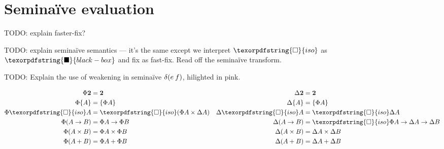 \documentclass{rntz}\usepackage[a5]{rntzgeometry}\usepackage[fullwidth=130mm,width=330pt,]{narrow}
\newcommand\todo[1]{{\color{ACMRed}#1}}
\newcommand\naive{na\"ive}
\newcommand\D\Delta
\newcommand\x\times
\newcommand\<{\mskip 4mu plus 4mu minus 1mu}
\newcommand\iso{{\texorpdfstring{\ensuremath{\square}}{iso}}}
\newcommand\isof{\iso}
\newcommand\blackiso{{\texorpdfstring{\ensuremath{\blacksquare}}{black-box}}}
\newcommand\tset[1]{\{{#1}\}}
\newcommand\tbool{{\boldsymbol 2}}
\begin{document}

\section{Semi\naive{} evaluation}
\label{sec:seminaive}

\todo{TODO: explain faster-fix?}

\todo{TODO: explain semi\naive{} semantics --- it's the same except we interpret
  $\iso$ as $\blackiso$ and fix as fast-fix. Read off the semi\naive{}
  transform.}

\todo{TODO: Explain the use of weakening in semi\naive{} $\delta(e\<f)$,
  hilighted in {\color{Rhodamine}pink}.}

\begin{figure*}
  \begin{align*}
    \Phi \tbool &= \tbool & \D\tbool &= \tbool\\
    \Phi \tset{A} &= \tset{\Phi A} & \D\tset{A} &= \tset{\Phi A}\\
    \Phi \isof A &= \isof{(\Phi A \x \D A)}
    & \D\isof A &= \isof \D A\\
    \Phi(A \to B) &= \Phi A \to \Phi B
    & \D(A \to B) &= \isof \Phi A \to \D A \to \D B\\
    \Phi(A \x B) &= \Phi A \x \Phi B & \D(A \x B) &= \D A \x \D B\\
    \Phi(A + B) &= \Phi A + \Phi B & \D(A + B) &= \D A + \D B
  \end{align*}
  \caption{Semi\naive{} type translation}
\end{figure*}
\end{document}
